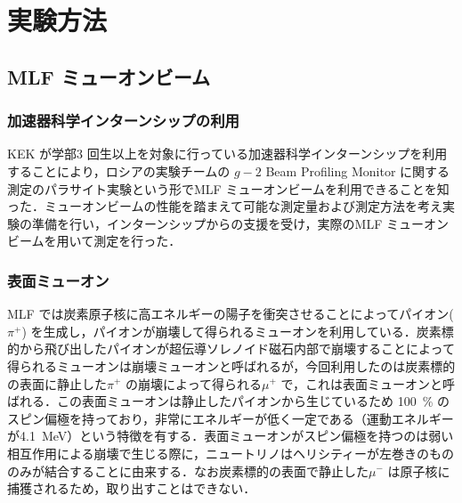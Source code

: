 



%


\section{実験方法}

\subsection{MLF ミューオンビーム}

\subsubsection{加速器科学インターンシップの利用}
KEK が学部3 回生以上を対象に行っている加速器科学インターンシップを利用することにより，ロシアの実験チームの $g - 2$ Beam Profiling Monitor に関する測定のパラサイト実験という形でMLF ミューオンビームを利用できることを知った．ミューオンビームの性能を踏まえて可能な測定量および測定方法を考え実験の準備を行い，インターンシップからの支援を受け，実際のMLF ミューオンビームを用いて測定を行った．

 \subsubsection{表面ミューオン}
 MLF では炭素原子核に高エネルギーの陽子を衝突させることによってパイオン($\pi^{+}$) を生成し，パイオンが崩壊して得られるミューオンを利用している．炭素標的から飛び出したパイオンが超伝導ソレノイド磁石内部で崩壊することによって得られるミューオンは崩壊ミューオンと呼ばれるが，今回利用したのは炭素標的の表面に静止した$\pi^{+}$ の崩壊によって得られる$\mu ^{+}$ で，これは表面ミューオンと呼ばれる．この表面ミューオンは静止したパイオンから生じているため 100~\% のスピン偏極を持っており，非常にエネルギーが低く一定である（運動エネルギーが4.1~MeV）という特徴を有する．表面ミューオンがスピン偏極を持つのは弱い相互作用による崩壊で生じる際に，ニュートリノはヘリシティーが左巻きのもののみが結合することに由来する．なお炭素標的の表面で静止した$\mu^-$ は原子核に捕獲されるため，取り出すことはできない．

